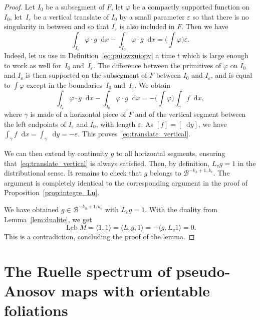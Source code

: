 \documentclass[10pt]{amsart}
\newcommand{\boB}{\mathcal{B}}
\newcommand{\dd}{\mathop{}\!\mathrm{d}}
\newcommand{\paregg}[1]{\biggl(#1\biggr)}
\DeclareMathOperator{\Leb}{Leb}
\let\epsilon\varepsilon
\let\phi\varphi
\theoremstyle{definition}
\numberwithin{equation}{section}
\begin{document}
\begin{proof}
Let $I_0$ be a subsegment of $F$, let $\phi$ be a compactly supported
function on $I_0$, let~$I_\epsilon$ be a vertical translate of $I_0$ by a
small parameter $\epsilon$ so that there is no singularity in between and so
that $I_\epsilon$ is also included in $F$. Then we have\vspace*{-3pt}
\begin{equation}
\label{eq:translate_vertical}
\int_{I_\epsilon} \phi \cdot g \dd x - \int_{I_0} \phi \cdot g \dd x = \paregg{\int \phi} \epsilon.
\end{equation}
Indeed, let us use in Definition~\eqref{eq:puiowxuiopv} a time $t$ which is
large enough to work as well for~$I_0$ and~$I_\epsilon$. The difference
between the primitives of $\phi$ on $I_0$ and $I_\epsilon$ is then supported
on the subsegment of $F$ between $I_0$ and $I_\epsilon$, and is equal to
$\int \phi$ except in the boundaries~$I_0$ and~$I_\epsilon$. We obtain\vspace*{-3pt}
\begin{equation*}
\int_{I_\epsilon} \phi \cdot g \dd x - \int_{I_0} \phi \cdot g \dd x = - \paregg{\int \phi} \int_\gamma f \dd x,
\end{equation*}
where $\gamma$ is made of a horizontal piece of $F$ and of the vertical
segment between the left endpoints of $I_\epsilon$ and $I_0$, with length
$\epsilon$. As $[f] = [\dd y]$, we have $\int_\gamma f \dd x = \int_\gamma
\dd y = - \epsilon$. This proves~\eqref{eq:translate_vertical}.

We can then extend by continuity $g$ to all horizontal segments, ensuring
that~\eqref{eq:translate_vertical} is always satisfied. Then, by definition,
$L_v g = 1$ in the distributional sense. It remains to check that $g$ belongs
to $\boB^{-k_h+1, k_v}$. The argument is completely identical to the
corresponding argument in the proof of Proposition~\ref{prop:integre_Lu}.

We have obtained $g \in \boB^{-k_h+1, k_v}$ with $L_v g = 1$. With the
duality from Lemma~\ref{lem:dualite}, we get\vspace*{-5pt}
\begin{equation*}
\Leb M = \langle 1, 1\rangle = \langle L_v g, 1 \rangle = - \langle g, L_v 1 \rangle
= 0.
\end{equation*}
This is a contradiction, concluding the proof of the lemma.
\end{proof}

\section{The Ruelle spectrum of pseudo-Anosov maps with orientable
foliations}
\end{document}
